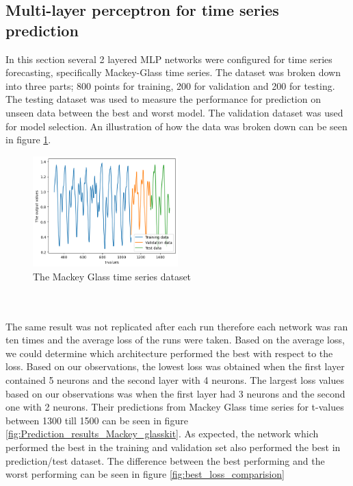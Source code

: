 \documentclass[a4paper]{article}
\begin{document}
\subsection{Multi-layer perceptron for time series prediction }
In this section several 2 layered MLP networks were configured for time series forecasting, specifically Mackey-Glass time series. The dataset was broken down into three parts; 800 points for training, 200 for validation and 200 for testing. The testing dataset was used to measure the performance for prediction on unseen data between the best and worst model. The validation dataset was used for model selection. An illustration of how the data was broken down can be seen in figure \ref{fig:Mackey_glass_dataset}.
\begin{figure}[htbp]
    \centering
    \includegraphics[width=0.5\textwidth]{Labs/Lab 1/Lab 1b/Part2/figure/data.png}
    \caption{The Mackey Glass time series dataset }
    \label{fig:Mackey_glass_dataset}
\end{figure}\\
\\The same result was not replicated after each run therefore each network was ran ten times and the average loss of the runs were taken. Based on the average loss, we could determine which architecture performed the best with respect to the loss. Based on our observations, the lowest loss was obtained when the first layer contained 5 neurons and the second layer with 4 neurons. The largest loss values based on our observations was when the first layer had 3 neurons and the second one with 2 neurons. Their predictions from Mackey Glass time series for t-values between 1300 till 1500 can be seen in figure \ref{fig:Prediction_results_Mackey_glasskit}. As expected, the network which performed the best in the training and validation set also performed the best in prediction/test dataset. The difference between the best performing and the worst performing can be seen in figure \ref{fig:best_loss_comparision}
\end{document}
